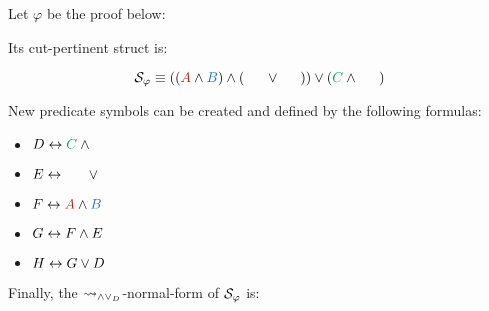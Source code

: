 \begin{example}
\label{example:PlusTimesDefinitionalNormalization}


Let $\varphi$ be the proof below:

\begin{prooftree}
		 
	 
						 
					 
					 
									 
								 
\end{prooftree}

Its cut-pertinent struct is:

$$
\struct{\varphi} 
\equiv 
((\hA{A} \structplus \hB{B}) \structplus (\hC{\structdual{B}} \structtimes \hD{\structdual{A}}))
\structtimes
(\hE{C} \structplus \hF{\structdual{C}})
$$

New predicate symbols can be created and defined by the following formulas: 

\begin{itemize}
\item $D \biimp \hE{C} \structplus \hF{\structdual{C}}$

\item $E \biimp \hC{\structdual{B}} \structtimes \hD{\structdual{A}}$

\item $F \biimp \hA{A} \structplus \hB{B}$

\item $G \biimp F \structplus E$

\item $H \biimp G \structtimes D$
\end{itemize}

Finally, the $\normalizePlusTimesD$-normal-form of $\struct{\varphi}$ is:


\end{example}
